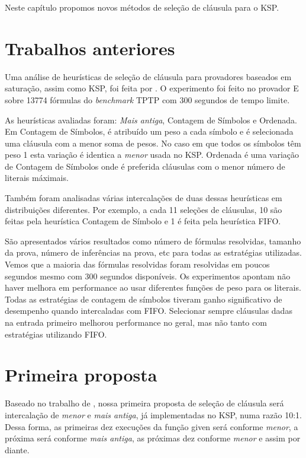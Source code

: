 Neste capítulo propomos novos métodos de seleção de cláusula para o KSP.

\section{Trabalhos anteriores}
Uma análise de heurísticas de seleção de cláusula para provadores baseados em saturação, assim como KSP, foi feita por \cite{stephan}. O experimento foi feito no provador E sobre 13774 fórmulas do \textit{benchmark} TPTP \cite{TPTP} com 300 segundos de tempo limite.

As heurísticas avaliadas foram: \textit{Mais antiga}, Contagem de Símbolos e Ordenada. Em Contagem de Símbolos, é atribuído um peso a cada símbolo e é selecionada uma cláusula com a menor soma de pesos. No caso em que todos os símbolos têm peso 1 esta variação é identica a \textit{menor} usada no KSP. Ordenada é uma variação de Contagem de Símbolos onde é preferida cláusulas com o menor número de literais máximais.

Também foram analisadas várias intercalações de duas dessas heurísticas em distribuições diferentes. Por exemplo, a cada 11 seleções de cláusulas, 10 são feitas pela heurística Contagem de Símbolo e 1 é feita pela heurística FIFO.

São apresentados vários resultados como número de fórmulas resolvidas, tamanho da prova, número de inferências na prova, etc para todas as estratégias utilizadas. Vemos que a maioria das fórmulas resolvidas foram resolvidas em poucos segundos mesmo com 300 segundos disponíveis. Os experimentos apontam não haver melhora em performance ao usar diferentes funções de peso para os literais. Todas as estratégias de contagem de símbolos tiveram ganho significativo de desempenho quando intercaladas com FIFO. Selecionar sempre cláusulas dadas na entrada primeiro melhorou performance no geral, mas não tanto com estratégias utilizando FIFO.

\section{Primeira proposta}
Baseado no trabalho de \cite{stephan}, nossa primeira proposta de seleção de cláusula será intercalação de \textit{menor} e \textit{mais antiga}, já implementadas no KSP, numa razão 10:1. Dessa forma, as primeiras dez execuções da função {\sf given} será conforme \textit{menor}, a próxima será conforme \textit{mais antiga}, as próximas dez conforme \textit{menor} e assim por diante.

